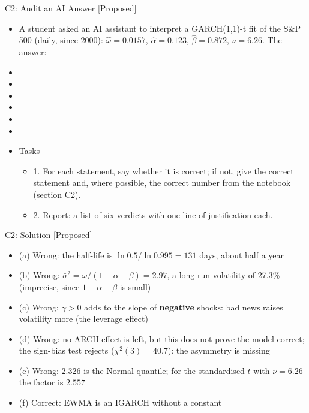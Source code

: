 \begin{frame}{C2: Audit an AI Answer [Proposed]}
\itemsize{\scriptsize}
\begin{itemize}
    \item A student asked an AI assistant to interpret a GARCH(1,1)-t fit of the S\&P 500 (daily, since 2000): $\hat\omega = 0.0157$, $\hat\alpha = 0.123$, $\hat\beta = 0.872$, $\hat\nu = 6.26$. The answer:
    \item {}
    \item {}
    \item {}
    \item {}
    \item {}
    \item {}
    \item Tasks
    \begin{itemize}
        \item 1. For each statement, say whether it is correct; if not, give the correct statement and, where possible, the correct number from the notebook (section C2).
        \item 2. Report: a list of six verdicts with one line of justification each.
    \end{itemize}
\end{itemize}
\end{frame}

\ifsolutions
\begin{frame}{C2: Solution [Proposed]}
\itemsize{\footnotesize}
\begin{itemize}
    \item (a) Wrong: the half-life is $\ln 0.5/\ln 0.995 = 131$ days, about half a year
    \item (b) Wrong: $\bar\sigma^2 = \omega/(1 - \alpha - \beta) = 2.97$, a long-run volatility of 27.3\% (imprecise, since $1 - \alpha - \beta$ is small)
    \item (c) Wrong: $\gamma > 0$ adds to the slope of \textbf{negative} shocks: bad news raises volatility more (the leverage effect)
    \item (d) Wrong: no ARCH effect is left, but this does not prove the model correct; the sign-bias test rejects ($\chi^2(3) = 40.7$): the asymmetry is missing
    \item (e) Wrong: 2.326 is the Normal quantile; for the standardised $t$ with $\nu = 6.26$ the factor is $2.557$
    \item (f) Correct: EWMA is an IGARCH without a constant
\end{itemize}
\end{frame}
\fi


